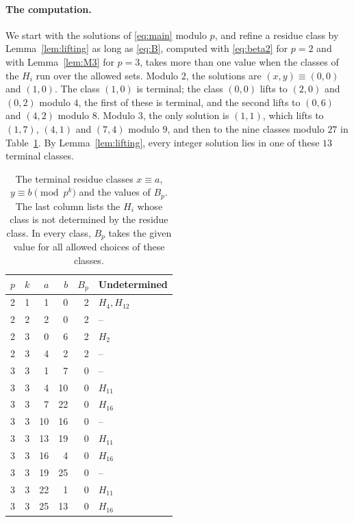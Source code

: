 \documentclass[11pt]{article}
\begin{document}
\paragraph{The computation.} We start with the solutions of \eqref{eq:main} modulo $p$, and refine a residue class by Lemma~\ref{lem:lifting} as long as \eqref{eq:B}, computed with \eqref{eq:beta2} for $p=2$ and with Lemma~\ref{lem:M3} for $p=3$, takes more than one value when the classes of the $H_i$ run over the allowed sets. Modulo $2$, the solutions are $(x,y)\equiv(0,0)$ and $(1,0)$. The class $(1,0)$ is terminal; the class $(0,0)$ lifts to $(2,0)$ and $(0,2)$ modulo $4$, the first of these is terminal, and the second lifts to $(0,6)$ and $(4,2)$ modulo $8$. Modulo $3$, the only solution is $(1,1)$, which lifts to $(1,7)$, $(4,1)$ and $(7,4)$ modulo $9$, and then to the nine classes modulo $27$ in Table~\ref{tab:local}. By Lemma~\ref{lem:lifting}, every integer solution lies in one of these $13$ terminal classes.

\begin{table}[htbp]
\centering\small
\setlength{\tabcolsep}{5pt}
\caption{The terminal residue classes $x\equiv a$, $y\equiv b\pmod{p^k}$ and the values of $B_p$. The last column lists the $H_i$ whose class is not determined by the residue class. In every class, $B_p$ takes the given value for all allowed choices of these classes.}\label{tab:local}
\begin{tabular}{@{}rrrrrl@{}}
			\toprule
			$p$ & $k$ & $a$ & $b$ & $B_p$ & Undetermined\\\midrule
			2 & 1 & 1 & 0 & 2 & $H_4,H_{12}$\\
			2 & 2 & 2 & 0 & 2 & --\\
			2 & 3 & 0 & 6 & 2 & $H_2$\\
			2 & 3 & 4 & 2 & 2 & --\\
			3 & 3 & 1 & 7 & 0 & --\\
			3 & 3 & 4 & 10 & 0 & $H_{11}$\\
			3 & 3 & 7 & 22 & 0 & $H_{16}$\\
			3 & 3 & 10 & 16 & 0 & --\\
			3 & 3 & 13 & 19 & 0 & $H_{11}$\\
			3 & 3 & 16 & 4 & 0 & $H_{16}$\\
			3 & 3 & 19 & 25 & 0 & --\\
			3 & 3 & 22 & 1 & 0 & $H_{11}$\\
			3 & 3 & 25 & 13 & 0 & $H_{16}$\\
			\bottomrule
		\end{tabular}
\end{table}
\end{document}
